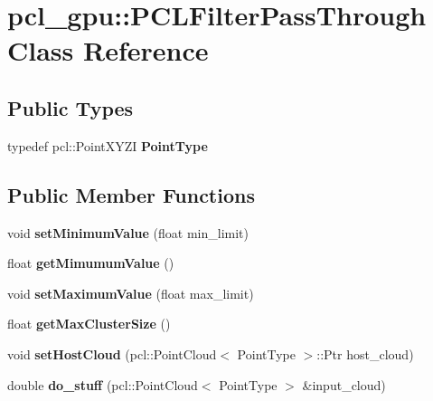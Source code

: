 \hypertarget{classpcl__gpu_1_1PCLFilterPassThrough}{}\section{pcl\+\_\+gpu\+:\+:P\+C\+L\+Filter\+Pass\+Through Class Reference}
\label{classpcl__gpu_1_1PCLFilterPassThrough}
\subsection*{Public Types}
\begin{DoxyCompactItemize}
\item 
\mbox{\label{classpcl__gpu_1_1PCLFilterPassThrough_a083ef76cdd702061ad5a5d3ee3951daa}} 
typedef pcl\+::\+Point\+X\+Y\+ZI {\bfseries Point\+Type}
\end{DoxyCompactItemize}
\subsection*{Public Member Functions}
\begin{DoxyCompactItemize}
\item 
\mbox{\label{classpcl__gpu_1_1PCLFilterPassThrough_aaa600333366010ed186b302b0dc4490a}} 
void {\bfseries set\+Minimum\+Value} (float min\+\_\+limit)
\item 
\mbox{\label{classpcl__gpu_1_1PCLFilterPassThrough_a71ccdc279fb9e4cf570d88ebdb096b31}} 
float {\bfseries get\+Mimumum\+Value} ()
\item 
\mbox{\label{classpcl__gpu_1_1PCLFilterPassThrough_aa13a3a33f5551161e336ac2b7b9a61ad}} 
void {\bfseries set\+Maximum\+Value} (float max\+\_\+limit)
\item 
\mbox{\label{classpcl__gpu_1_1PCLFilterPassThrough_a2ca93ccd94e9121178cf3776d5869175}} 
float {\bfseries get\+Max\+Cluster\+Size} ()
\item 
\mbox{\label{classpcl__gpu_1_1PCLFilterPassThrough_a6ea68b2b017dc3d722b1e56aef9231f0}} 
void {\bfseries set\+Host\+Cloud} (pcl\+::\+Point\+Cloud$<$ Point\+Type $>$\+::Ptr host\+\_\+cloud)
\item 
\mbox{\label{classpcl__gpu_1_1PCLFilterPassThrough_a6909a4c42b990aa94ad47ead7277c7f4}} 
double {\bfseries do\+\_\+stuff} (pcl\+::\+Point\+Cloud$<$ Point\+Type $>$ \&input\+\_\+cloud)
\end{DoxyCompactItemize}
